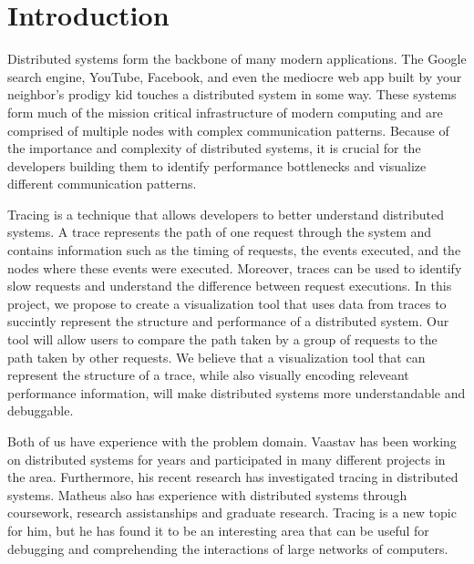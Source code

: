 \section{Introduction}

Distributed systems form the backbone of many modern applications. The Google search engine,
YouTube, Facebook, and even the mediocre web app built by your neighbor's prodigy kid touches
a distributed system in some way. These systems form much of the mission critical infrastructure
of modern computing and are comprised of multiple nodes with complex communication patterns. Because
of the importance and complexity of distributed systems, it is crucial for the developers building
them to identify performance bottlenecks and visualize different communication patterns. 

Tracing is a technique that allows developers to better understand distributed systems. A trace represents the
path of one request through the system and contains information such as the timing of requests, 
the events executed, and the nodes where these events were executed. Moreover, traces can be used
to identify slow requests and understand the difference between request executions. In this project, we
propose to create a visualization tool that uses data from traces to succintly represent the structure 
and performance of a distributed system. Our tool will allow users to compare the path taken by a group
of requests to the path taken by other requests. We believe that a visualization tool that can represent the
structure of a trace, while also visually encoding releveant performance information, will make distributed
systems more understandable and debuggable.

Both of us have experience with the problem domain. Vaastav has been working on distributed systems for years
and participated in many different projects in the area. Furthermore, his recent research has investigated
tracing in distributed systems. Matheus also has experience with distributed systems through coursework,
research assistanships and graduate research. Tracing is a new topic for him, but he has found it to be
an interesting area that can be useful for debugging and comprehending the interactions of large networks
of computers.